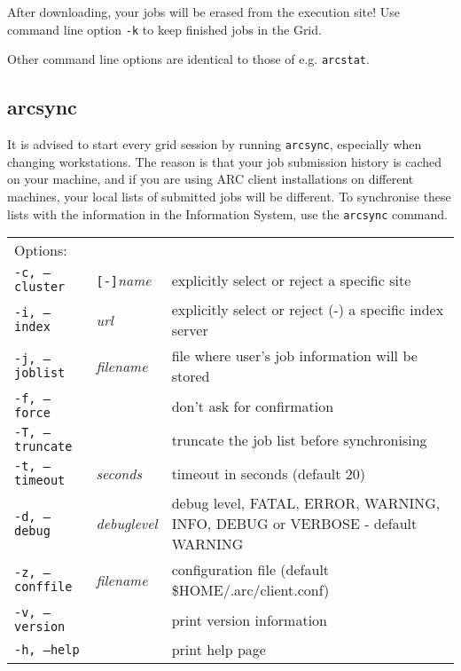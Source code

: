 \begin{framed}
 After downloading, your jobs will be erased from the execution site! Use command line option \verb#-k#
 to keep finished jobs in the Grid.
\end{framed}

Other command line options are identical to those of e.g. \verb#arcstat#.

\subsection{arcsync}
\label{sec:arcsync}

It is advised to start every grid session by running \texttt{arcsync},
especially when changing workstations. The reason is that your job submission
history is cached on your machine, and if you are using ARC client
installations on different machines, your local lists of submitted jobs will be different. To synchronise
these lists with the information in the Information System, use the
\texttt{arcsync}  command.

\hspace*{0.5cm}
\begin{shaded}
\end{shaded}
\begin{longtable}{llp{8cm}}
   Options:&&\\
   \texttt{-c, --cluster}&\verb#[-]#\textit{name}&explicitly select or reject a specific site\\
   \texttt{-i, --index}&\textit{url}&explicitly select or reject (-) a specific index server\\
   \texttt{-j, --joblist}&\textit{filename}&file where user's job information will be stored\\
   \texttt{-f, --force}& &don't ask for confirmation\\
   \texttt{-T, --truncate}& &truncate the job list before synchronising\\
   \texttt{-t, --timeout}&\textit{seconds}&timeout in seconds (default 20)\\
   \texttt{-d, --debug}&\textit{debuglevel}&debug level, FATAL, ERROR, WARNING, INFO, DEBUG or VERBOSE - default WARNING\\
   \texttt{-z, --conffile}&\textit{filename}& configuration file (default {\$}HOME/.arc/client.conf)\\
   \texttt{-v, --version}&&print version information\\
   \texttt{-h, --help}&&print help page\\
\end{longtable}

